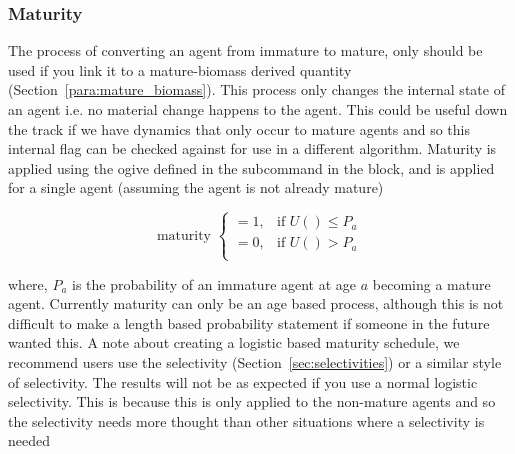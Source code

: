 \subsubsection{Maturity}\label{subsubsec:maturity}
The process of converting an agent from immature to mature, only should be used if you link it to a mature-biomass derived quantity (Section~\ref{para:mature_biomass}). This process only changes the internal state of an agent i.e. no material change happens to the agent. This could be useful down the track if we have dynamics that only occur to mature agents and so this internal flag can be checked against for use in a different algorithm. Maturity is applied using the ogive defined in the subcommand  in the  block, and is applied for a single agent (assuming the agent is not already mature)

\begin{equation}
	\text{maturity }\begin{cases}
	 = 1, & \text{if } U() \leq P_a\\
	 = 0, & \text{if } U() > P_a\\
	\end{cases}
\end{equation}

where, $P_a$ is the probability of an immature agent at age $a$ becoming a mature agent. Currently maturity can only be an age based process, although this is not difficult to make a length based probability statement if someone in the future wanted this. A note about creating a logistic based maturity schedule, we recommend users use the selectivity  (Section~\ref{sec:selectivities}) or a similar style of selectivity. The results will not be as expected if you use a normal logistic selectivity. This is because this is only applied to the non-mature agents and so the selectivity needs more thought than other situations where a selectivity is needed\\

